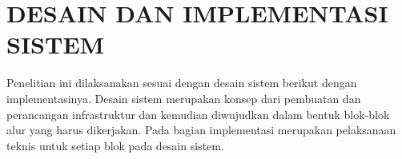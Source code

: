 \chapter{DESAIN DAN IMPLEMENTASI SISTEM}
\label{chap:desainimplementasi}

Penelitian ini dilaksanakan sesuai dengan desain sistem berikut dengan implementasinya.
Desain sistem merupakan konsep dari pembuatan dan perancangan infrastruktur dan kemudian diwujudkan dalam bentuk blok-blok alur yang harus dikerjakan.
Pada bagian implementasi merupakan pelaksanaan teknis untuk setiap blok pada desain sistem.
\textcolor{red}{\lipsum[1][1-5]}
